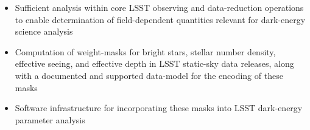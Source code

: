 \begin{itemize}
\item Sufficient analysis within core LSST observing and data-reduction operations to enable 
determination of field-dependent quantities relevant for dark-energy science analysis 
\item Computation of weight-masks for bright stars, stellar number density, effective seeing, and 
effective depth in LSST static-sky data releases, along with a documented and 
supported data-model for the encoding of these masks
\item Software infrastructure for incorporating these masks into LSST dark-energy parameter analysis
\end{itemize}



